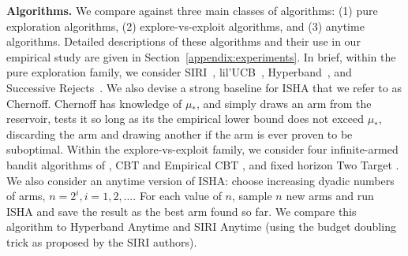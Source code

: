 

\textbf{Algorithms.}
We compare against three main
classes of algorithms: (1) pure exploration algorithms, (2)
explore-vs-exploit algorithms, and (3) anytime algorithms.  Detailed
descriptions of these algorithms and their use in our empirical study
are given in Section~\ref{appendix:experiments}.  In brief, within
the pure exploration family, we consider
SIRI~\citep{DBLP:journals/corr/CarpentierV15},
lil'UCB~\citep{Jamieson2014lilU}, Hyperband~\citep{li2017hyperband},
and Successive Rejects~\citep{DBLP:conf/colt/AudibertBM10}.  We also devise a
strong baseline for ISHA that we refer to as Chernoff.
Chernoff has knowledge of $\mu_*$, and simply draws an arm from the
reservoir, tests it so long as its the empirical lower bound does not
exceed $\mu_*$, discarding the arm and drawing another if the arm is
ever proven to be suboptimal.  Within the explore-vs-exploit family,
we consider four infinite-armed bandit algorithms of \cite{berry1997}, CBT
and Empirical CBT \citep{Chan2018Infinite}, and fixed horizon Two
Target \citep{bonald2013two}.  We also consider an anytime version of ISHA:
choose increasing dyadic numbers of arms, $n=2^i, i=1,2,\dots$.  For each value of $n$,
sample $n$ new arms and run ISHA and save the result as the best arm found so far.  We compare this
algorithm to Hyperband Anytime and SIRI Anytime (using the budget
doubling trick as proposed by the SIRI authors).

